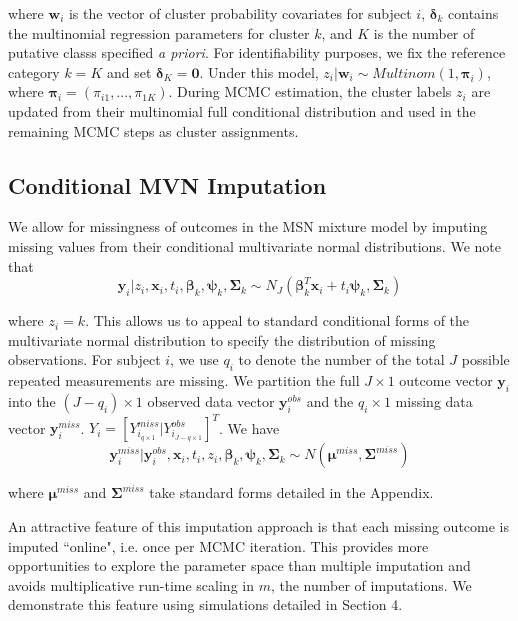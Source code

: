 \documentclass{article}
\begin{document}
where $\mathbf{w}_i$ is the vector of cluster probability covariates for subject $i$, $\boldsymbol\delta_k$ contains the multinomial regression parameters for cluster $k$, and $K$ is the number of putative classs specified \textit{a priori}. For identifiability purposes, we fix the reference category $k = K$ and set $\boldsymbol\delta_K = \mathbf{0}$. Under this model, $z_i|\mathbf{w}_i \sim Multinom(1,\boldsymbol\pi_i)$, where $\boldsymbol\pi_i = (\pi_{i1},...,\pi_{1K})$. During MCMC estimation, the cluster labels $z_i$ are updated from their multinomial full conditional distribution and used in the remaining MCMC steps as cluster assignments.

\subsection{Conditional MVN Imputation}

We allow for missingness of outcomes in the MSN mixture model by imputing missing values from their conditional multivariate normal distributions. We note that
$$\mathbf{y}_i|z_i,\mathbf{x}_i,t_i,\boldsymbol\beta_{k},\boldsymbol\psi_{k},\boldsymbol\Sigma_{k} \sim N_J(\boldsymbol\beta_{k}^T\mathbf{x}_i  + t_i \boldsymbol\psi_{k}, \boldsymbol\Sigma_{k})$$

where $z_i = k$. This allows us to appeal to standard conditional forms of the multivariate normal distribution to specify the distribution of missing observations. For subject $i$, we use $q_i$ to denote the number of the total $J$ possible repeated measurements are missing. We partition the full $J \times 1$ outcome vector $\mathbf{y}_i$ into the $(J - q_i) \times 1$ observed data vector $\mathbf{y}_i^{obs}$ and the $q_i \times 1$ missing data vector $\mathbf{y}_i^{miss}$. $Y_i = [Y^{miss}_{i_{q \times 1}} | Y^{obs}_{i_{J - q \times 1}}]^T$. We have
$$\mathbf{y}_i^{miss}|\mathbf{y}_i^{obs},\mathbf{x}_i,t_i,z_i,\boldsymbol\beta_{k},\boldsymbol\psi_{k},\boldsymbol\Sigma_{k} \sim N(\boldsymbol\mu^{miss},\boldsymbol\Sigma^{miss})$$

where $\boldsymbol\mu^{miss}$ and $\boldsymbol\Sigma^{miss}$ take standard forms detailed in the Appendix. 

An attractive feature of this imputation approach is that each missing outcome is imputed ``online", i.e. once per MCMC iteration. This provides more opportunities to explore the parameter space than multiple imputation and avoids multiplicative run-time scaling in $m$, the number of imputations. We demonstrate this feature using simulations detailed in Section 4. 
\end{document}
